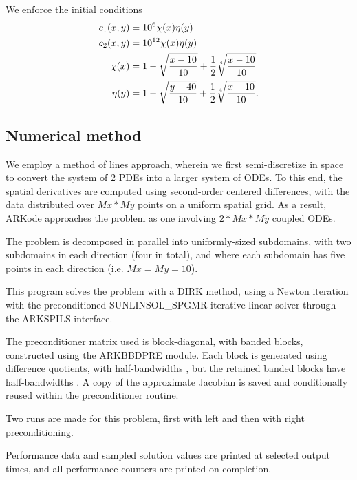 \documentclass[letterpaper,10pt,english]{sphinxmanual}
\begin{document}
We enforce the initial conditions
\begin{gather}
\begin{split}c_1(x,y) &=  10^6 \chi(x)\eta(y) \\
c_2(x,y) &=  10^{12} \chi(x)\eta(y) \\
\chi(x) &= 1 - \sqrt{\frac{x - 10}{10}} + \frac12 \sqrt[4]{\frac{x - 10}{10}} \\
\eta(y) &= 1 - \sqrt{\frac{y - 40}{10}} + \frac12 \sqrt[4]{\frac{x - 10}{10}}.\end{split}\notag
\end{gather}

\subsection{Numerical method}
\label{c_parallel:numerical-method}
We employ a method of lines approach, wherein we first
semi-discretize in space to convert the system of 2 PDEs into a larger
system of ODEs.  To this end, the spatial derivatives are computed
using second-order centered differences, with the data distributed
over \(Mx*My\) points on a uniform spatial grid.  As a result, ARKode
approaches the problem as one involving \(2*Mx*My\) coupled ODEs.

The problem is decomposed in parallel into uniformly-sized subdomains,
with two subdomains in each direction (four in total), and where each
subdomain has five points in each direction (i.e. \(Mx=My=10\)).

This program solves the problem with a DIRK method, using a Newton
iteration with the preconditioned SUNLINSOL\_SPGMR iterative linear
solver through the ARKSPILS interface.

The preconditioner matrix used is block-diagonal, with banded blocks,
constructed using the ARKBBDPRE module.  Each block is generated using
difference quotients, with half-bandwidths , but
the retained banded blocks have half-bandwidths .
A copy of the approximate Jacobian is saved and conditionally reused
within the preconditioner routine.

Two runs are made for this problem, first with left and then with
right preconditioning.

Performance data and sampled solution values are printed at
selected output times, and all performance counters are printed
on completion.
\end{document}
